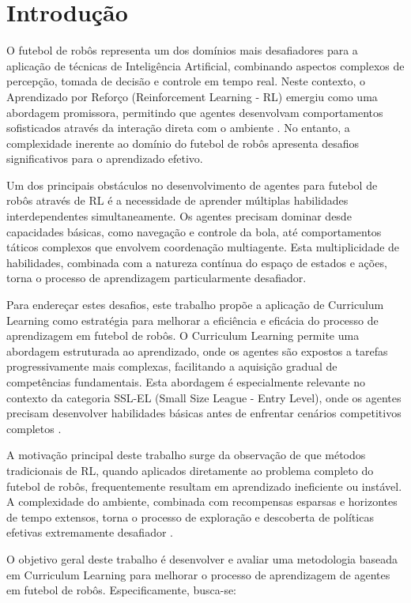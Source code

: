 
\chapter{Introdução}
\label{cap:intro}

O futebol de robôs representa um dos domínios mais desafiadores para a aplicação de técnicas de Inteligência Artificial, combinando aspectos complexos de percepção, tomada de decisão e controle em tempo real. Neste contexto, o Aprendizado por Reforço (Reinforcement Learning - RL) emergiu como uma abordagem promissora, permitindo que agentes desenvolvam comportamentos sofisticados através da interação direta com o ambiente \cite{sutton}. No entanto, a complexidade inerente ao domínio do futebol de robôs apresenta desafios significativos para o aprendizado efetivo.

Um dos principais obstáculos no desenvolvimento de agentes para futebol de robôs através de RL é a necessidade de aprender múltiplas habilidades interdependentes simultaneamente. Os agentes precisam dominar desde capacidades básicas, como navegação e controle da bola, até comportamentos táticos complexos que envolvem coordenação multiagente. Esta multiplicidade de habilidades, combinada com a natureza contínua do espaço de estados e ações, torna o processo de aprendizagem particularmente desafiador.

Para endereçar estes desafios, este trabalho propõe a aplicação de Curriculum Learning como estratégia para melhorar a eficiência e eficácia do processo de aprendizagem em futebol de robôs. O Curriculum Learning permite uma abordagem estruturada ao aprendizado, onde os agentes são expostos a tarefas progressivamente mais complexas, facilitando a aquisição gradual de competências fundamentais. Esta abordagem é especialmente relevante no contexto da categoria SSL-EL (Small Size League - Entry Level), onde os agentes precisam desenvolver habilidades básicas antes de enfrentar cenários competitivos completos \cite{regras_vss2023}.

A motivação principal deste trabalho surge da observação de que métodos tradicionais de RL, quando aplicados diretamente ao problema completo do futebol de robôs, frequentemente resultam em aprendizado ineficiente ou instável. A complexidade do ambiente, combinada com recompensas esparsas e horizontes de tempo extensos, torna o processo de exploração e descoberta de políticas efetivas extremamente desafiador \cite{relay_long_horizon}.

O objetivo geral deste trabalho é desenvolver e avaliar uma metodologia baseada em Curriculum Learning para melhorar o processo de aprendizagem de agentes em futebol de robôs. Especificamente, busca-se:

